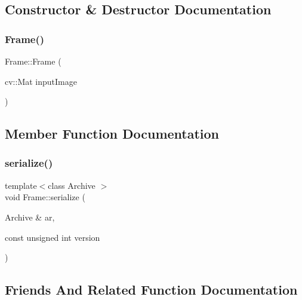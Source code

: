 \subsection{Constructor \& Destructor Documentation}
\mbox{\label{classFrame_af76c0928474fc6132e92511d8ac0791d}} 
\subsubsection{\texorpdfstring{Frame()}{Frame()}}
{\footnotesize\ttfamily Frame\+::\+Frame (\begin{DoxyParamCaption}\item[{cv\+::\+Mat}]{input\+Image }\end{DoxyParamCaption})\hspace{0.3cm}{\ttfamily [inline]}}



\subsection{Member Function Documentation}
\mbox{\label{classFrame_a2ad8e5090a32bab1894f2dcd84e50512}} 
\subsubsection{\texorpdfstring{serialize()}{serialize()}}
{\footnotesize\ttfamily template$<$class Archive $>$ \\
void Frame\+::serialize (\begin{DoxyParamCaption}\item[{Archive \&}]{ar,  }\item[{const unsigned int}]{version }\end{DoxyParamCaption})\hspace{0.3cm}{\ttfamily [inline]}}



\subsection{Friends And Related Function Documentation}
\mbox{\label{classFrame_ac98d07dd8f7b70e16ccb9a01abf56b9c}} 
